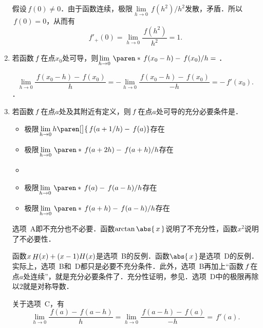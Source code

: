 \begin{enumerate}
  \ifshowsol
    假设\(\,f(0) \ne 0\)．由于函数连续，极限\(\lim\limits_{h\to0} {\,f(h^2)}/{h^2}\)发散，矛盾．所以\(\,f(0) = 0\)，从而有
    \begin{equation*}
      f'_+(0)
      = \lim_{h\to0} \frac{\,f(h^2)}{h^2} = 1.
    \end{equation*}
  \fi

\item 若函数\(\,f\mkern2mu\)在点\(x_0\)处可导，则\(\lim\limits_{h\to0} \,\paren*{\,f(x_0-h) - \,f(x_0)}/{h} =\)
  \ifshowsol
    {\setlength{\ULdepth}{.9ex}%
      \uline{}}．

    \begin{equation*}
      \lim_{h\to0} \frac{\,f(x_0-h) - \,f(x_0)}{h}
      = - \lim_{h\to0} \frac{\,f(x_0-h) - \,f(x_0)}{-h}
      = - \,f'(x_0).
    \end{equation*}
  \else
    \uline{\hspace{6em}}．
  \fi

\item 若函数\(\,f\mkern2mu\)在点\(a\)处及其附近有定义，则\(\,f\mkern2mu\)在点\(a\)处可导的充分必要条件是\uline{\hfill}．
  \begin{itemize}
    \renewcommand{\labelitemi}{\faCircleThin}
  \item 极限\(\lim\limits_{h\to0} h\paren[\big]{\,f(a+1/h) - \,f(a)}\)存在
  \item 极限\(\lim\limits_{h\to0} \,\paren*{\,f(a+2h) - \,f(a+h)}/{h}\)存在
    \ifshowsol
    \item[\faCircle]
    \else
    \item
    \fi
    极限\(\lim\limits_{h\to0} \,\paren*{\,f(a) - \,f(a-h)}/{h}\)存在
  \item 极限\(\lim\limits_{h\to0} \,\paren*{\,f(a+h) - \,f(a-h)}/{h}\)存在
  \end{itemize}

  \ifshowsol
    选项~A即不充分也不必要．函数\(\arctan\abs{\,x\,}\)说明了不充分性，函数\(x^2\)说明了不必要性．

    函数\(x\mathop{\relax H}\nolimits(x) + (x-1)H(x)\)是选项~B的反例．函数\(\abs{\,x\,}\)是选项~D的反例．实际上，选项~B和~D都只是必要不充分条件．此外，选项~B再加上“函数\(\,f\mkern2mu\)在点\(a\)处连续”，就是充分必要条件了．充分性证明，参见\cite{5099525}．选项~D中的极限再除以\(2\)就是对称导数\cite{Aull67}．

    关于选项~C，有
    \begin{equation*}
      \lim_{h\to0} \frac{\,f(a) - \,f(a-h)}{h}
      = \lim_{h\to0} \frac{\,f(a-h) - \,f(a)}{-h}
      = \,f'(a).
    \end{equation*}
  \fi


\end{enumerate}
